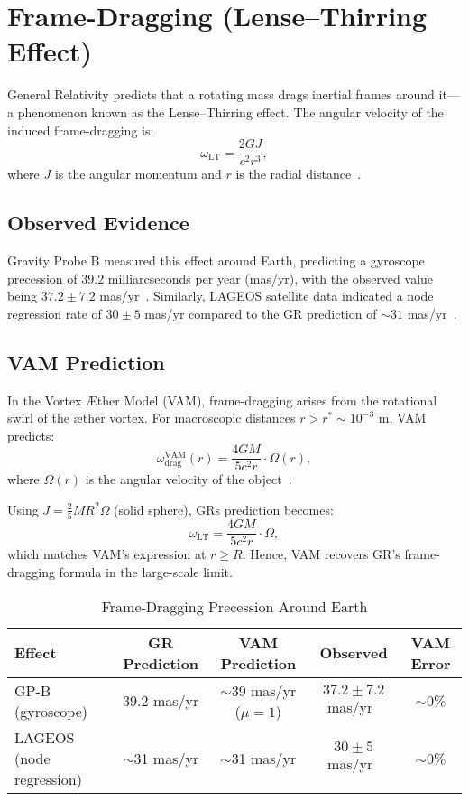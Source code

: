 \section{Frame-Dragging (Lense--Thirring Effect)}

General Relativity predicts that a rotating mass drags inertial frames around it—a phenomenon known as the Lense--Thirring effect. The angular velocity of the induced frame-dragging is:
\[
    \omega_\text{LT} = \frac{2GJ}{c^2 r^3},
\]
where $J$ is the angular momentum and $r$ is the radial distance~\cite{ciufolini2004confirmation}.

\subsection*{Observed Evidence}
Gravity Probe B measured this effect around Earth, predicting a gyroscope precession of $39.2$ milliarcseconds per year (mas/yr), with the observed value being $37.2 \pm 7.2$ mas/yr~\cite{everitt2011gravity}. Similarly, LAGEOS satellite data indicated a node regression rate of $30 \pm 5$ mas/yr compared to the GR prediction of $\sim31$ mas/yr~\cite{ciufolini2004confirmation}.

\subsection*{VAM Prediction}
In the Vortex Æther Model (VAM), frame-dragging arises from the rotational swirl of the æther vortex. For macroscopic distances $r > r^* \sim 10^{-3}$ m, VAM predicts:
\[
    \omega^\text{VAM}_\text{drag}(r) = \frac{4GM}{5c^2 r} \cdot \Omega(r),
\]
where $\Omega(r)$ is the angular velocity of the object~\cite{iskandarani2025VAM2}.

Using $J = \frac{2}{5}MR^2\Omega$ (solid sphere), GR\rqs s prediction becomes:
\[
    \omega_\text{LT} = \frac{4GM}{5c^2 r} \cdot \Omega,
\]
which matches VAM's expression at $r \ge R$. Hence, VAM recovers GR's frame-dragging formula in the large-scale limit.

\begin{table}[h]
    \centering
    \caption{Frame-Dragging Precession Around Earth}
    \begin{tabular}{|l|c|c|c|c|}
        \hline
        \textbf{Effect} & \textbf{GR Prediction} & \textbf{VAM Prediction} & \textbf{Observed} & \textbf{VAM Error} \\
        \hline
        GP-B (gyroscope) & 39.2 mas/yr & $\sim$39 mas/yr ($\mu=1$) & $37.2 \pm 7.2$ mas/yr~\cite{everitt2011gravity} & $\sim$0\% \\
        LAGEOS (node regression) & $\sim$31 mas/yr & $\sim$31 mas/yr & $30 \pm 5$ mas/yr~\cite{ciufolini2004confirmation} & $\sim$0\% \\
        \hline
    \end{tabular}
\end{table}

